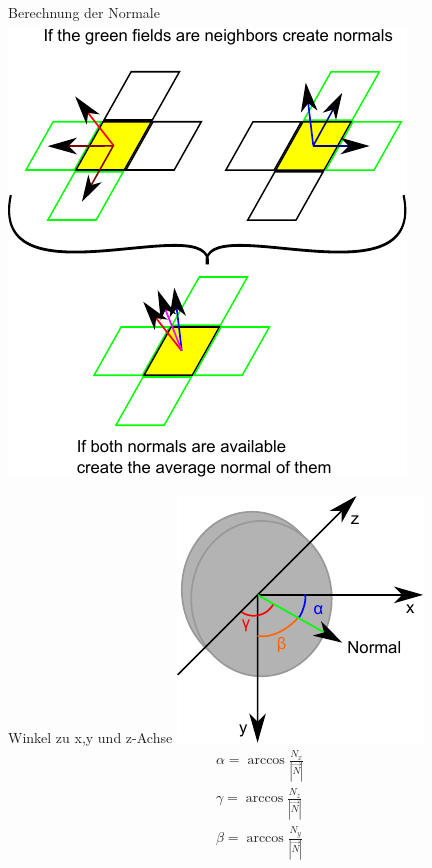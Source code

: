 \documentclass{VLKlauck}
\begin{document}
\begin{frame}{Berechnung der Normale}
{\begin{gather}
		\end{gather}
	}
	\includegraphics[scale=0.5]{normals.pdf}
	\end{frame}
	   
	\begin{frame}{Winkel zu x,y und z-Achse}
		  \includegraphics[scale=0.9]{Angles.pdf}
		\begin{align}
		 \alpha = \arccos \frac{N_x}{\left|\vec{N}\right|}  
		\nonumber\\
		 \gamma = \arccos \frac{N_z}{\left|\vec{N}\right|}  
		\nonumber\\
		 \beta  = \arccos \frac{N_y}{\left|\vec{N}\right|}  
		\nonumber
		\end{align} 
	\end{frame}
	
\end{document}
